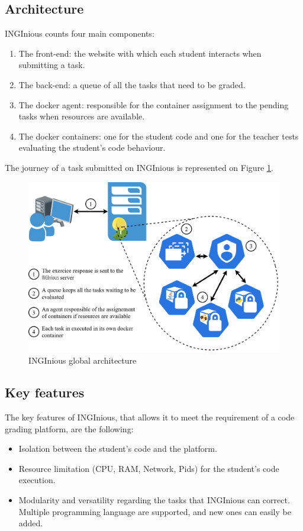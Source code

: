 \subsection{Architecture}
INGInious counts four main components:
\begin{enumerate}
  \item The front-end: the website with which each student interacts when submitting a task.
  \item The back-end: a queue of all the tasks that need to be graded.
  \item The docker agent: responsible for the container assignment to the pending tasks when resources are available.
  \item The docker containers: one for the student code and one for the teacher tests evaluating the student's code behaviour.
\end{enumerate}
The journey of a task submitted on INGInious is represented on Figure \ref{fig:architecture}.
\begin{figure}[!h]
  \begin{center}
    \includegraphics[width=\linewidth]{images/Architecture.png}
    \caption{INGInious global architecture}
    \label{fig:architecture}
  \end{center}
\end{figure}

\subsection{Key features}
The key features of INGInious, that allows it to meet the requirement of a code grading platform, are the following:
\begin{itemize}
  \item Isolation between the student's code and the platform.
  \item Resource limitation (CPU, RAM, Network, Pids) for the student's code execution.
  \item Modularity and versatility regarding the tasks that INGInious can correct.  Multiple programming language are supported, and new ones can easily be added.
\end{itemize}

